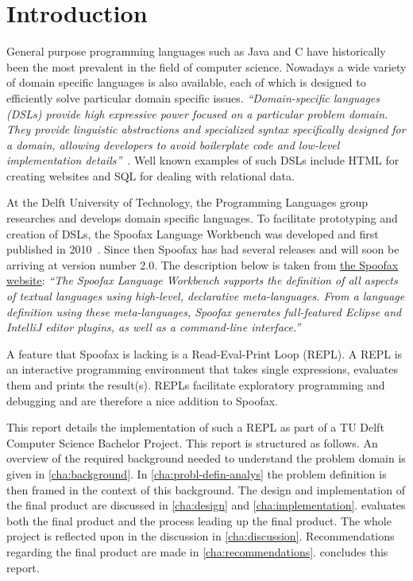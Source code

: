 \chapter{Introduction}
\label{cha:introduction}

General purpose programming languages such as Java and C have historically been
the most prevalent in the field of computer science. Nowadays a wide variety of
domain specific languages is also available, each of which is designed to
efficiently solve particular domain specific issues. \textit{``Domain-specific
languages (DSLs) provide high expressive power focused on a particular problem
domain. They provide linguistic abstractions and specialized syntax
specifically designed for a domain, allowing developers to avoid boilerplate
code and low-level implementation details''}~\cite{Kats10a}. Well known
examples of such DSLs include HTML for creating websites and SQL for dealing
with relational data.

At the Delft University of Technology, the Programming Languages group researches and develops domain specific languages. To
facilitate prototyping and creation of DSLs, the Spoofax Language Workbench was
developed and first published in 2010~\cite{Kats10a}. Since then Spoofax has had
several releases and will soon be arriving at version number 2.0. The
description below is taken from \href{http://spoofax.org}{the Spoofax website}:
\textit{``The Spoofax Language Workbench supports the definition of all aspects
of textual languages using high-level, declarative meta-languages. From a
language definition using these meta-languages, Spoofax generates full-featured
Eclipse and IntelliJ editor plugins, as well as a command-line interface.''}

A feature that Spoofax is lacking is a Read-Eval-Print Loop (REPL). A
REPL is an interactive programming environment that takes single expressions,
evaluates them and prints the result(s). REPLs facilitate exploratory
programming and debugging and are therefore a nice addition to Spoofax.

This report details the implementation of such a REPL as part of a
TU Delft Computer Science Bachelor Project. This report is structured as
follows. An overview of the
required background needed to understand the problem domain is given in
\cref{cha:background}. In \cref{cha:probl-defin-analys} the problem definition
is then framed in the context of this background. The design and implementation
of the final product are discussed in \cref{cha:design} and
\cref{cha:implementation}.  evaluates both the
final product and the process leading up the final product. The whole
project is reflected upon in the discussion in \cref{cha:discussion}.
Recommendations regarding the final product are made in
\cref{cha:recommendations}.  concludes this report.

